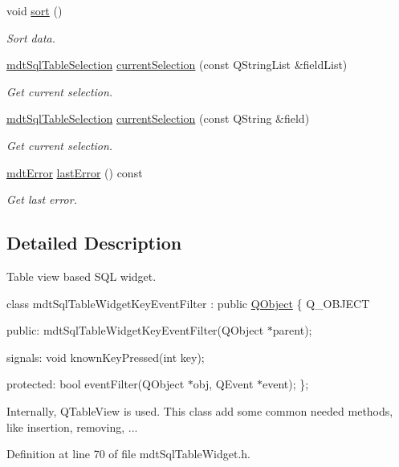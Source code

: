 \begin{DoxyCompactItemize}
void \hyperlink{classmdt_sql_table_widget_a5e1323816fce33680857048db8cbb255}{sort} ()
\begin{DoxyCompactList}\small\item\em Sort data. \end{DoxyCompactList}\item 
\hyperlink{classmdt_sql_table_selection}{mdt\-Sql\-Table\-Selection} \hyperlink{classmdt_sql_table_widget_a65f1bb0ebf82f73ef4a61e53ec4a26a7}{current\-Selection} (const Q\-String\-List \&field\-List)
\begin{DoxyCompactList}\small\item\em Get current selection. \end{DoxyCompactList}\item 
\hyperlink{classmdt_sql_table_selection}{mdt\-Sql\-Table\-Selection} \hyperlink{classmdt_sql_table_widget_adb4792d2ed64a9cce61bc429986ae9a1}{current\-Selection} (const Q\-String \&field)
\begin{DoxyCompactList}\small\item\em Get current selection. \end{DoxyCompactList}\item 
\hyperlink{classmdt_error}{mdt\-Error} \hyperlink{classmdt_sql_table_widget_a15ca772be92e80bbb964a72a8706fbeb}{last\-Error} () const 
\begin{DoxyCompactList}\small\item\em Get last error. \end{DoxyCompactList}\end{DoxyCompactItemize}


\subsection{Detailed Description}
Table view based S\-Q\-L widget. 

class mdt\-Sql\-Table\-Widget\-Key\-Event\-Filter \-: public \hyperlink{class_q_object}{Q\-Object} \{ Q\-\_\-\-O\-B\-J\-E\-C\-T

public\-: mdt\-Sql\-Table\-Widget\-Key\-Event\-Filter(\-Q\-Object $\ast$parent);

signals\-: void known\-Key\-Pressed(int key);

protected\-: bool event\-Filter(\-Q\-Object $\ast$obj, Q\-Event $\ast$event); \};

Internally, Q\-Table\-View is used. This class add some common needed methods, like insertion, removing, ... 

Definition at line 70 of file mdt\-Sql\-Table\-Widget.\-h.



